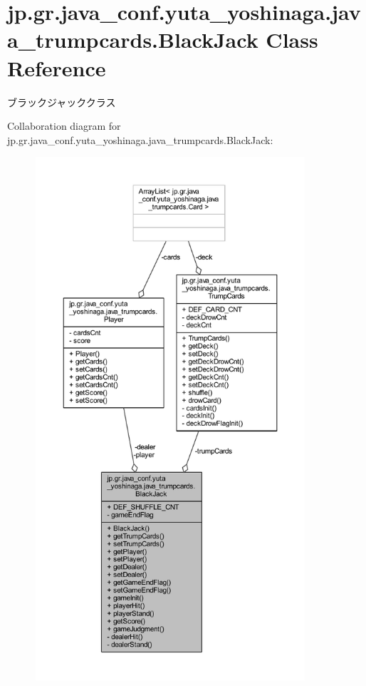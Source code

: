 \hypertarget{classjp_1_1gr_1_1java__conf_1_1yuta__yoshinaga_1_1java__trumpcards_1_1_black_jack}{}\section{jp.\+gr.\+java\+\_\+conf.\+yuta\+\_\+yoshinaga.\+java\+\_\+trumpcards.\+Black\+Jack Class Reference}
\label{classjp_1_1gr_1_1java__conf_1_1yuta__yoshinaga_1_1java__trumpcards_1_1_black_jack}


ブラックジャッククラス  




Collaboration diagram for jp.\+gr.\+java\+\_\+conf.\+yuta\+\_\+yoshinaga.\+java\+\_\+trumpcards.\+Black\+Jack\+:
\nopagebreak
\begin{figure}[H]
\begin{center}
\leavevmode
\includegraphics[height=550pt]{classjp_1_1gr_1_1java__conf_1_1yuta__yoshinaga_1_1java__trumpcards_1_1_black_jack__coll__graph}
\end{center}
\end{figure}
